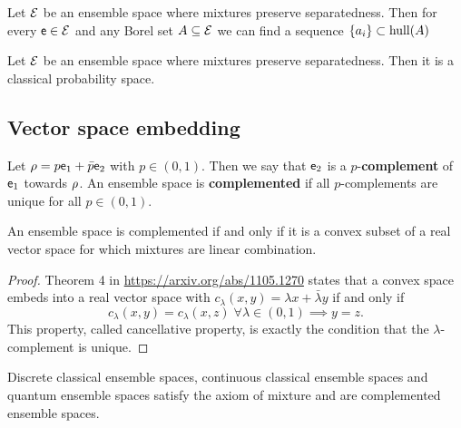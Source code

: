 \begin{prop}
	Let $\Ens$ be an ensemble space where mixtures preserve separatedness. Then for every $\ens \in \Ens$ and any Borel set $A \subseteq \Ens$ we can find a sequence $\{a_i\} \subset \hull(A) $
\end{prop}

\begin{conj}
	Let $\Ens$ be an ensemble space where mixtures preserve separatedness. Then it is a classical probability space.
\end{conj}




\subsection{Vector space embedding}

\begin{defn}
	 Let $\ens[\rho] = p \ens_1 + \bar{p} \ens_2$ with $p \in (0,1)$. Then we say that $\ens_2$ is a $p$-\textbf{complement} of $\ens_1$ towards $\ens[\rho]$. An ensemble space is \textbf{complemented} if all $p$-complements are unique for all $p \in (0, 1)$.
\end{defn}

\begin{prop}\label{pm_es_complementedIsVectorSpace}
	An ensemble space is complemented if and only if it is a convex subset of a real vector space for which mixtures are linear combination.
\end{prop}

\begin{proof}
	Theorem 4 in \url{https://arxiv.org/abs/1105.1270} states that a convex space embeds into a real vector space with $c_\lambda(x,y) = \lambda x + \bar{\lambda}y$ if and only if
	$$ c_\lambda(x,y) = c_\lambda(x,z) \; \forall \lambda \in (0,1) \implies y = z.$$ This property, called cancellative property, is exactly the condition that the $\lambda$-complement is unique.
\end{proof}

\begin{prop}
	Discrete classical ensemble spaces, continuous classical ensemble spaces and quantum ensemble spaces satisfy the axiom of mixture and are complemented ensemble spaces.
\end{prop}

